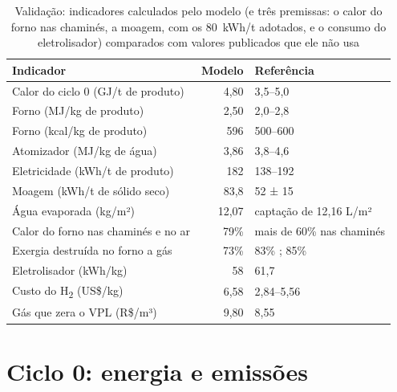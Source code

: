 \documentclass[10pt,a4paper,twocolumn]{article}
\newcommand{\Ht}{H\textsubscript{2}}
\begin{document}
\begin{table}[!t]
\centering
\caption{Validação: indicadores calculados pelo modelo (e três premissas: o calor do forno nas chaminés, a moagem, com os 80~kWh/t adotados, e o consumo do eletrolisador) comparados com valores publicados que ele não usa}\label{tab:valid}
\footnotesize
\begin{tabular}{L{3.3cm}rL{2.4cm}}
\toprule
\textbf{Indicador} & \textbf{Modelo} & \textbf{Referência}\\ \midrule
Calor do ciclo 0 (GJ/t de produto) & 4,80 & 3,5--5,0 \cite{monfort2010}\\
Forno (MJ/kg de produto) & 2,50 & 2,0--2,8 \cite{monfort2010}\\
Forno (kcal/kg de produto) & 596 & 500--600 \cite[p.~115]{oliveira2015}\\
Atomizador (MJ/kg de água) & 3,86 & 3,8--4,6 \cite{negre2000}\\
Eletricidade (kWh/t de produto) & 182 & 138--192 \cite{monfort2010}\\
Moagem (kWh/t de sólido seco) & 83,8 & 52 ± 15 \cite{monfort2010}\\
Água evaporada (kg/m²) & 12,07 & captação de 12,16 L/m² \cite{portobello2025}\\
Calor do forno nas chaminés e no ar & 79\% & mais de 60\% nas chaminés \cite{ferrer2019}\\
Exergia destruída no forno a gás & 73\% & 83\% \cite{ferrer2019}; 85\% \cite{wang2020}\\
Eletrolisador (kWh/kg) & 58 & 61,7 \cite{castineiras2025}\\
Custo do \Ht{} (US\$/kg) & 6,58 & 2,84--5,56 \cite{castineiras2025}\\
Gás que zera o VPL (R\$/m³) & 9,80 & 8,55 \cite{castineiras2025}\\
\bottomrule
\end{tabular}
\end{table}

\section{Ciclo 0: energia e emissões}
\end{document}
